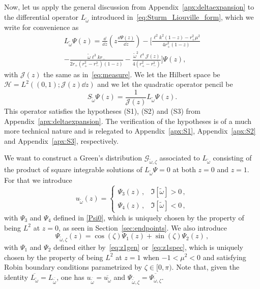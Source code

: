 \documentclass[aps, prd, amsmath, floats, floatfix, twocolumn, nofootinbib, superscriptaddress, showpacs]{revtex4-1}
\def\H{\mathcal{H}}
\def\cG{\mathcal{G}}
\def\cJ{\mathcal{J}}
\def\tomega{{\tilde{\omega}}}
\begin{document}
Now, let us apply the general discussion from
Appendix~\ref{apx:deltaexpansion} to the differential operator $L_\tomega$
introduced in~\eqref{eq:Sturm_Liouville_form}, which we write for convenience as
%
\begin{multline}
	L_\tomega\Psi(z)
	= \frac{\dd}{\dd z} \left( z \frac{\dd \Psi(z)}{\dd z} \right)
	- \bigg[ \frac{\ell^2 k^2(1-z)-r_+^2\mu^2}{4 r_+^2(1-z)} 
	\\
	- \frac{\tilde{\omega} \ell^3 k r_-}{2r_+ (r_+^2-r_-^2) (1-z)}
	- \frac{\tilde{\omega}^2\ell^4 \cJ(z)}{4(r_+^2-r_-^2)}
	\bigg] \Psi(z)	, \label{eq:B1}
\end{multline}
%
with $\cJ(z)$ the same as in~\eqref{eq:measure}. We let the Hilbert
space be $\H = L^2((0,1); \cJ(z)\dd{z})$ and we let the quadratic operator pencil be
\begin{equation} \label{eq:SLop}
S_{\tilde{\omega}}\Psi(z) = \frac{1}{\cJ(z)} L_\tomega\Psi(z) .
\end{equation}
This operator satisfies the hypotheses (S1), (S2) and (S3) from
Appendix~\ref{apx:deltaexpansion}. The verification of the hypotheses is of a much more technical nature and is relegated to Appendix~\ref{apx:S1}, 
Appendix~\ref{apx:S2} and Appendix~\ref{apx:S3}, respectively.

We want to construct a Green's distribution $\cG_{\tomega,\zeta}$ associated to $L_\tomega$ 
consisting of the product of square integrable solutions of $L_\tomega \Psi = 0$ at both $z=0$ and $z=1$.
For that we introduce
\begin{equation}
u_{\tilde{\omega}}(z) = \begin{cases}
\Psi_3(z) \, , & \Im[\tilde{\omega}] > 0 \, , \\
\Psi_4(z) \, , & \Im[\tilde{\omega}] < 0 \, ,
\end{cases} \label{eq:functionu}
\end{equation}
with $\Psi_3$ and $\Psi_4$ defined in \eqref{Psi0}, which is uniquely chosen by the property of being
$L^2$ at $z=0$, as seen in Section~\ref{sec:endpoints}. 
We also introduce
\begin{equation} \label{eq:functionv}
\Psi_{\tomega,\zeta}(z) = \cos(\zeta)\Psi_1(z)+\sin(\zeta)\Psi_2(z) \, ,
\end{equation}
with $\Psi_1$ and $\Psi_2$ defined either
by~\eqref{eq:z1gen} or~\eqref{eq:z1spec}, which is uniquely chosen by the property of being
$L^2$ at $z=1$  when $-1<\mu^2<0$ and satisfying Robin boundary conditions parametrized by $\zeta\in [0,\pi)$.
Note that, given the identity $\overline{L_{\tomega}} =
L_{\overline{\tomega}}$, one has
$u_{\overline{\tomega}} = \overline{u_{\tomega}}$ and
$\Psi_{\overline{\tomega},\zeta} = \overline{\Psi_{\tomega,\zeta}}$.
\end{document}
